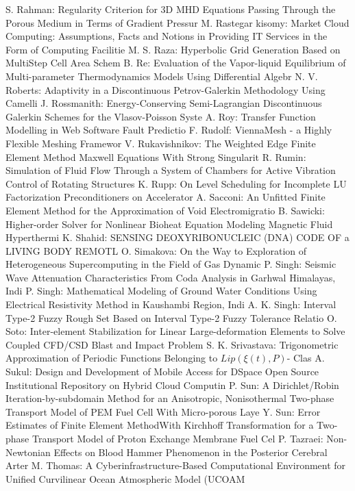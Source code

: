\documentclass[10pt, A4]{article}%
\begin{document}
{S. Rahman}: {Regularity Criterion for 3D MHD Equations Passing Through the Porous Medium in Terms of Gradient Pressur}
{M. Rastegar kisomy}: {Market Cloud Computing: Assumptions, Facts and Notions in Providing IT Services in the Form of Computing Facilitie}
{M. S. Raza}: {Hyperbolic Grid Generation Based on MultiStep Cell Area Schem}
{B. Re}: {Evaluation of the Vapor-liquid Equilibrium of Multi-parameter Thermodynamics Models Using Differential Algebr}
{N. V. Roberts}: {Adaptivity in a Discontinuous Petrov-Galerkin Methodology Using Camelli}
{J. Rossmanith}: {Energy-Conserving Semi-Lagrangian Discontinuous Galerkin Schemes for the Vlasov-Poisson Syste}
{A. Roy}: {Transfer Function Modelling in Web Software Fault Predictio}
{F. Rudolf}: {ViennaMesh - a Highly Flexible Meshing Framewor}
{V. Rukavishnikov}: {The Weighted Edge Finite Element Method Maxwell Equations With Strong Singularit}
{R. Rumin}: {Simulation of Fluid Flow Through a System of Chambers for Active Vibration Control of Rotating Structures}
{K. Rupp}: {On Level Scheduling for Incomplete LU Factorization Preconditioners on Accelerator}
{A. Sacconi}: {An Unfitted Finite Element Method for the Approximation of Void Electromigratio}
{B. Sawicki}: {Higher-order Solver for Nonlinear Bioheat Equation Modeling Magnetic Fluid Hyperthermi}
{K. Shahid}: {SENSING DEOXYRIBONUCLEIC (DNA) CODE OF a LIVING BODY REMOTL}
{O. Simakova}: {On the Way to Exploration of Heterogeneous Supercomputing in the Field of Gas Dynamic}
{P. Singh}: {Seismic Wave Attenuation Characteristics  From Coda Analysis in Garhwal Himalayas, Indi}
{P. Singh}: {Mathematical Modeling of Ground Water Conditions Using Electrical Resistivity Method in Kaushambi Region, Indi}
{A. K. Singh}: {Interval Type-2 Fuzzy Rough Set Based on Interval Type-2 Fuzzy Tolerance Relatio}
{O. Soto}: {Inter-element Stabilization for Linear Large-deformation Elements to Solve Coupled CFD/CSD Blast and Impact Problem}
{S. K. Srivastava}: {Trigonometric Approximation of Periodic Functions Belonging to $Lip(\xi(t), P)$- Clas}
{A. Sukul}: {Design and Development of Mobile Access for DSpace Open Source Institutional Repository on Hybrid Cloud Computin}
{P. Sun}: {A Dirichlet/Robin Iteration-by-subdomain Method for an Anisotropic, Nonisothermal Two-phase Transport Model of PEM Fuel Cell With Micro-porous Laye}
{Y. Sun}: {Error Estimates of Finite Element MethodWith Kirchhoff Transformation for a Two-phase Transport Model of Proton Exchange Membrane Fuel Cel}
{P. Tazraei}: {Non-Newtonian Effects on Blood Hammer Phenomenon in the Posterior Cerebral Arter}
{M. Thomas}: {A Cyberinfrastructure-Based Computational Environment for Unified Curvilinear Ocean Atmospheric Model  (UCOAM}
\end{document}
